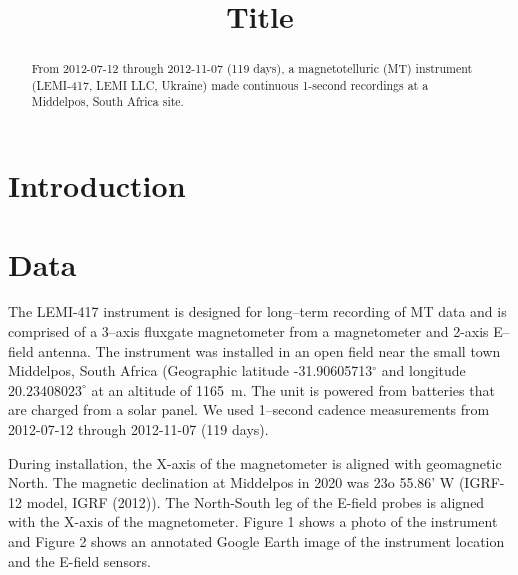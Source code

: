 \documentclass[draft,linenumbers]{agujournal2018}
\begin{document}
\title{Title}





\begin{keypoints}
\item 
\item 
\item 
\end{keypoints}

\begin{abstract}
From 2012-07-12 through 2012-11-07 (119 days), a magnetotelluric (MT) instrument (LEMI-417, LEMI LLC, Ukraine)  made continuous 1-second recordings at a Middelpos, South Africa site.
\end{abstract}

\section{Introduction}

\section{Data}
\label{section:Data}

The LEMI-417 instrument is designed for long--term recording of MT data and is comprised of a 3--axis fluxgate magnetometer from a  magnetometer and 2-axis E--field antenna. The instrument was installed in an open field near the small town Middelpos, South Africa (Geographic latitude -31.90605713$^\circ$ and longitude $20.23408023^\circ$ at an altitude of 1165~m. The unit is powered from batteries that are charged from a solar panel. We used 1--second cadence measurements from 2012-07-12 through 2012-11-07 (119 days).

During installation, the X-axis of the magnetometer is aligned with geomagnetic North. The magnetic declination at Middelpos in 2020 was 23o 55.86’ W (IGRF-12 model, IGRF (2012)). The North-South leg of the E-field probes is aligned with the X-axis of the magnetometer. Figure 1 shows a photo of the instrument and Figure 2 shows an annotated Google Earth image of the instrument location and the E-field sensors.
\end{document}
